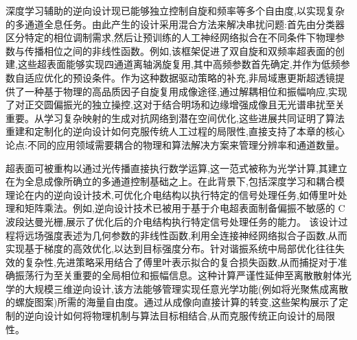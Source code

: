 \documentclass[11pt]{article}
\begin{document}
深度学习辅助的逆向设计现已能够独立控制自旋和频率等多个自由度,以实现复杂的多通道全息任务。由此产生的设计采用混合方法来解决串扰问题:首先由分类器区分特定的相位调制需求,然后让预训练的人工神经网络拟合在不同条件下物理参数与传播相位之间的非线性函数。例如,该框架促进了双自旋和双频率超表面的创建,这些超表面能够实现四通道离轴涡旋复用,其中高频参数首先确定,并作为低频参数自适应优化的预设条件。作为这种数据驱动策略的补充,非局域惠更斯超透镜提供了一种基于物理的高品质因子自旋复用成像途径,通过解耦相位和振幅响应,实现了对正交圆偏振光的独立操控,这对于结合明场和边缘增强成像且无光谱串扰至关重要。从学习复杂映射的生成对抗网络到潜在空间优化,这些进展共同证明了算法重建和定制化的逆向设计如何克服传统人工过程的局限性,直接支持了本章的核心论点:不同的应用领域需要耦合的物理和算法解决方案来管理分辨率和通道数量。\citep{doi_10_1117_1_apn_2_1_016010_57069347} \citep{doi_10_1038_s41377_024_01728_3_7dbdfab0} \citep{doi_10_3390_photonics12100947_b44bdefd}

超表面可被重构以通过光传播直接执行数学运算,这一范式被称为光学计算,其建立在为全息成像所确立的多通道控制基础之上。在此背景下,包括深度学习和耦合模理论在内的逆向设计技术,可优化介电结构以执行特定的信号处理任务,如傅里叶处理和矩阵乘法。例如,逆向设计技术已被用于基于介电超表面制备偏振不敏感的 C 波段达曼光栅,展示了优化后的介电结构执行特定信号处理任务的能力。\citep{doi_10_1016_j_rinp_2023_106238_0ebde0ff} 该设计过程将远场强度表述为几何参数的非线性函数,利用全连接神经网络拟合子函数,从而实现基于梯度的高效优化,以达到目标强度分布。针对谐振系统中局部优化往往失效的复杂性,先进策略采用结合了傅里叶表示拟合的复合损失函数,从而捕捉对于准确振荡行为至关重要的全局相位和振幅信息。这种计算严谨性延伸至离散散射体光学的大规模三维逆向设计,该方法能够管理实现任意光学功能(例如将光聚焦成离散的螺旋图案)所需的海量自由度。通过从成像向直接计算的转变,这些架构展示了定制的逆向设计如何将物理机制与算法目标相结合,从而克服传统正向设计的局限性。\citep{doi_10_1021_acsphotonics_4c00171_f68cb79c} \citep{doi_10_1515_nanoph_2020_0379_1cc596ab} \citep{doi_10_1117_12_2511323_41684364}
\end{document}
